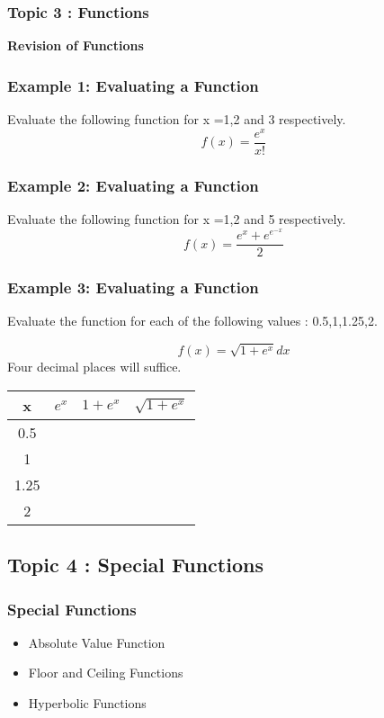 \begin{itemize}
\begin{frame}
	\frametitle{Topic 3 : Functions}
	\textbf{Revision of Functions}
\end{frame}
\begin{frame}
	\frametitle{Example 1: Evaluating a Function}
	Evaluate the following function for x =1,2 and 3 respectively.
	\[ f(x) = \frac{e^x}{x!} \]
\end{frame}
\begin{frame}
	\frametitle{Example 2: Evaluating a Function}
	Evaluate the following function for x =1,2 and 5 respectively.
	\[ f(x) = \frac{e^x + e^{e^{-x}}}{2} \]
\end{frame}
\begin{frame}

\frametitle{Example 3: Evaluating a Function}
Evaluate the function for each of the following values : 0.5,1,1.25,2.

\[f(x) =  \sqrt{1+e^{x}} dx \]
 Four decimal places will suffice.
\end{frame}
\begin{frame}
	\begin{center}
\begin{tabular}{|c|c|c|c|}
	\hline \rule[-2ex]{0pt}{5.5ex} x & $e^x$ & $1+e^x$ & $\sqrt{1+e^x}$ \\ 
	\hline \rule[-2ex]{0pt}{5.5ex} 0.5 & \phantom{space}  &  &  \\ 
	\hline \rule[-2ex]{0pt}{5.5ex} 1 &  &  &  \\ 
	\hline \rule[-2ex]{0pt}{5.5ex} 1.25 & \phantom{space}  &  &  \\ 
	\hline \rule[-2ex]{0pt}{5.5ex} 2 & \phantom{space}  &  & \phantom{space}  \\ 
	\hline 
\end{tabular} 
 \end{center}
\end{frame}


\subsection*{Topic 4 : Special Functions}
\begin{frame}
	\frametitle{Special Functions}
	\begin{itemize}
		\item Absolute Value Function
		\item Floor and Ceiling Functions
		\item Hyperbolic Functions
	\end{itemize}	
\end{frame}



\end{itemize}
